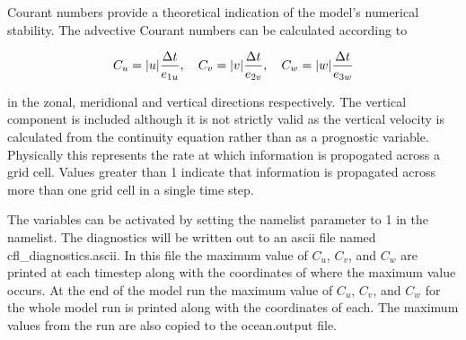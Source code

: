 \documentclass[../tex_main/NEMO_manual]{subfiles}
\begin{document}
Courant numbers provide a theoretical indication of the model's numerical stability.
The advective Courant numbers can be calculated according to

\[	C_u = |u|\frac{\Delta t}{e_{1u}}, \quad C_v = |v|\frac{\Delta t}{e_{2v}}, \quad C_w = |w|\frac{\Delta t}{e_{3w}}
 \label{eq:CFL} \]

in the zonal, meridional and vertical directions respectively.
The vertical component is included although it is not strictly valid as the vertical velocity is 
calculated from the continuity equation rather than as a prognostic variable.
Physically this represents the rate at which information is propogated across a grid cell.
Values greater than 1 indicate that information is propagated across more than one grid cell in 
a single time step.

The variables can be activated by setting the  namelist parameter to 1 in 
the  namelist.
The diagnostics will be written out to an ascii file named cfl\_diagnostics.ascii.
In this file the maximum value of $C_u$, $C_v$, and $C_w$ are printed at each timestep along with 
the coordinates of where the maximum value occurs.
At the end of the model run the maximum value of $C_u$, $C_v$, and $C_w$ for the whole model run is 
printed along with the coordinates of each.
The maximum values from the run are also copied to the ocean.output file. 

\end{document}
